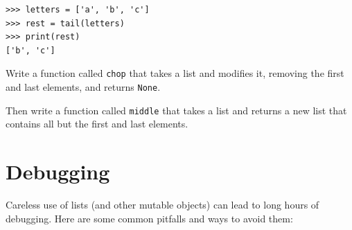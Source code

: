 \documentclass[10pt]{book}
\begin{document}
\beforeverb
\begin{verbatim}
>>> letters = ['a', 'b', 'c']
>>> rest = tail(letters)
>>> print(rest)
['b', 'c']
\end{verbatim}
\afterverb


\begin{ex}

Write a function called {\tt chop} that takes a list and modifies
it, removing the first and last elements, and returns {\tt None}.

Then write a function called {\tt middle} that takes a list and
returns a new list that contains all but the first and last
elements.

\end{ex}


\section{Debugging}

Careless use of lists (and other mutable objects)
can lead to long hours of debugging.  Here are some common
pitfalls and ways to avoid them:
\end{document}
